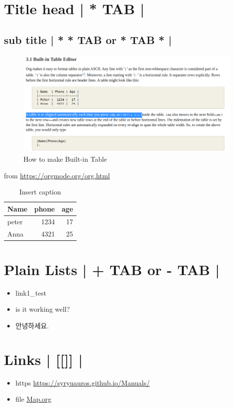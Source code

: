\documentclass[11pt]{article}
\author{JJ Kim}
\date{\today}
\title{}
\begin{document}
\tableofcontents

\section{Title head  | *  TAB |}
\label{sec:org36a0fd1}
\subsection{sub title | * * TAB or * TAB * |}
\label{sec:orge882d6a}
 \begin{figure}[htbp]
\centering
\includegraphics[width=.9\linewidth]{./img/samples/samples1.png}
\caption{\label{fig:a-1}How to make Built-in Table}
\end{figure}
from \url{https://orgmode.org/org.html}

\begin{table}[htbp]
\caption{\label{table: 1}Insert caption}
\centering
\begin{tabular}{lrr}
Name & phone & age\\
\hline
peter & 1234 & 17\\
Anna & 4321 & 25\\
\end{tabular}
\end{table}



\section{Plain Lists | + TAB or - TAB |}
\label{sec:orgc41db69}
\begin{itemize}
\item link1\_test
\item is it working well?
\item 안녕하세요.
\end{itemize}


\section{Links | [[]] |}
\label{sec:orgee7d5d4}
\begin{itemize}
\item https    \url{https://syryuauros.github.io/Manuals/}
\item file       \url{Map.org}
\end{itemize}
\end{document}
